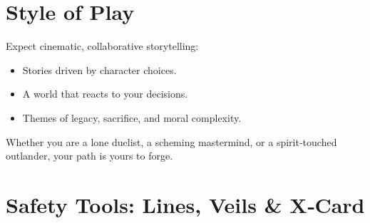 \section*{Style of Play}

Expect cinematic, collaborative storytelling:
\begin{itemize}
\item Stories driven by character choices.
\item A world that reacts to your decisions.
\item Themes of legacy, sacrifice, and moral complexity.
\end{itemize}

Whether you are a lone duelist, a scheming mastermind, or a spirit‑touched outlander, your path is yours to forge.

\section*{Safety Tools: Lines, Veils \& X‑Card}
\label{sec:safety}

